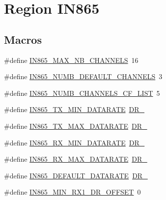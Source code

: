 \hypertarget{group__REGIONIN865}{}\section{Region I\+N865}
\label{group__REGIONIN865}
\subsection*{Macros}
\begin{DoxyCompactItemize}
\item 
\#define \hyperlink{group__REGIONIN865_ga6fbcf463cb8df05984d576d96383651d}{I\+N865\+\_\+\+M\+A\+X\+\_\+\+N\+B\+\_\+\+C\+H\+A\+N\+N\+E\+LS}~16
\item 
\#define \hyperlink{group__REGIONIN865_ga166b325d6a142fe02d403487b708fcbb}{I\+N865\+\_\+\+N\+U\+M\+B\+\_\+\+D\+E\+F\+A\+U\+L\+T\+\_\+\+C\+H\+A\+N\+N\+E\+LS}~3
\item 
\#define \hyperlink{group__REGIONIN865_gacf065f42ef7f7e9c2815559116faf20a}{I\+N865\+\_\+\+N\+U\+M\+B\+\_\+\+C\+H\+A\+N\+N\+E\+L\+S\+\_\+\+C\+F\+\_\+\+L\+I\+ST}~5
\item 
\#define \hyperlink{group__REGIONIN865_ga334bf7f8b226ad91762f977490af0c72}{I\+N865\+\_\+\+T\+X\+\_\+\+M\+I\+N\+\_\+\+D\+A\+T\+A\+R\+A\+TE}~\hyperlink{group__REGION_ga6c4ef966b4f3d5eb7597b087f2b97095}{D\+R\+\_}
\item 
\#define \hyperlink{group__REGIONIN865_ga927945116c9bf6917614b894d45c0972}{I\+N865\+\_\+\+T\+X\+\_\+\+M\+A\+X\+\_\+\+D\+A\+T\+A\+R\+A\+TE}~\hyperlink{group__REGION_ga3a06805baf4f00911a3a5d3dbadebf61}{D\+R\+\_}
\item 
\#define \hyperlink{group__REGIONIN865_ga59fe5dabb4cddd00deb343648d18e8cc}{I\+N865\+\_\+\+R\+X\+\_\+\+M\+I\+N\+\_\+\+D\+A\+T\+A\+R\+A\+TE}~\hyperlink{group__REGION_ga6c4ef966b4f3d5eb7597b087f2b97095}{D\+R\+\_}
\item 
\#define \hyperlink{group__REGIONIN865_gac1653eb95c60570e630c485302a8c2af}{I\+N865\+\_\+\+R\+X\+\_\+\+M\+A\+X\+\_\+\+D\+A\+T\+A\+R\+A\+TE}~\hyperlink{group__REGION_ga3a06805baf4f00911a3a5d3dbadebf61}{D\+R\+\_}
\item 
\#define \hyperlink{group__REGIONIN865_ga2bf71935d5975ceb0e8e9b1e810e52f9}{I\+N865\+\_\+\+D\+E\+F\+A\+U\+L\+T\+\_\+\+D\+A\+T\+A\+R\+A\+TE}~\hyperlink{group__REGION_ga6c4ef966b4f3d5eb7597b087f2b97095}{D\+R\+\_}
\item 
\#define \hyperlink{group__REGIONIN865_ga898979e964849e97c76ef8417bf69990}{I\+N865\+\_\+\+M\+I\+N\+\_\+\+R\+X1\+\_\+\+D\+R\+\_\+\+O\+F\+F\+S\+ET}~0

\end{DoxyCompactItemize}
